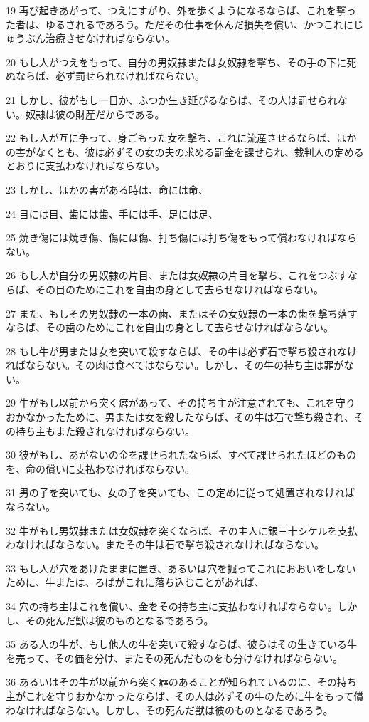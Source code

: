 \par 19 再び起きあがって、つえにすがり、外を歩くようになるならば、これを撃った者は、ゆるされるであろう。ただその仕事を休んだ損失を償い、かつこれにじゅうぶん治療させなければならない。
\par 20 もし人がつえをもって、自分の男奴隷または女奴隷を撃ち、その手の下に死ぬならば、必ず罰せられなければならない。
\par 21 しかし、彼がもし一日か、ふつか生き延びるならば、その人は罰せられない。奴隷は彼の財産だからである。
\par 22 もし人が互に争って、身ごもった女を撃ち、これに流産させるならば、ほかの害がなくとも、彼は必ずその女の夫の求める罰金を課せられ、裁判人の定めるとおりに支払わなければならない。
\par 23 しかし、ほかの害がある時は、命には命、
\par 24 目には目、歯には歯、手には手、足には足、
\par 25 焼き傷には焼き傷、傷には傷、打ち傷には打ち傷をもって償わなければならない。
\par 26 もし人が自分の男奴隷の片目、または女奴隷の片目を撃ち、これをつぶすならば、その目のためにこれを自由の身として去らせなければならない。
\par 27 また、もしその男奴隷の一本の歯、またはその女奴隷の一本の歯を撃ち落すならば、その歯のためにこれを自由の身として去らせなければならない。
\par 28 もし牛が男または女を突いて殺すならば、その牛は必ず石で撃ち殺されなければならない。その肉は食べてはならない。しかし、その牛の持ち主は罪がない。
\par 29 牛がもし以前から突く癖があって、その持ち主が注意されても、これを守りおかなかったために、男または女を殺したならば、その牛は石で撃ち殺され、その持ち主もまた殺されなければならない。
\par 30 彼がもし、あがないの金を課せられたならば、すべて課せられたほどのものを、命の償いに支払わなければならない。
\par 31 男の子を突いても、女の子を突いても、この定めに従って処置されなければならない。
\par 32 牛がもし男奴隷または女奴隷を突くならば、その主人に銀三十シケルを支払わなければならない。またその牛は石で撃ち殺されなければならない。
\par 33 もし人が穴をあけたままに置き、あるいは穴を掘ってこれにおおいをしないために、牛または、ろばがこれに落ち込むことがあれば、
\par 34 穴の持ち主はこれを償い、金をその持ち主に支払わなければならない。しかし、その死んだ獣は彼のものとなるであろう。
\par 35 ある人の牛が、もし他人の牛を突いて殺すならば、彼らはその生きている牛を売って、その価を分け、またその死んだものをも分けなければならない。
\par 36 あるいはその牛が以前から突く癖のあることが知られているのに、その持ち主がこれを守りおかなかったならば、その人は必ずその牛のために牛をもって償わなければならない。しかし、その死んだ獣は彼のものとなるであろう。

